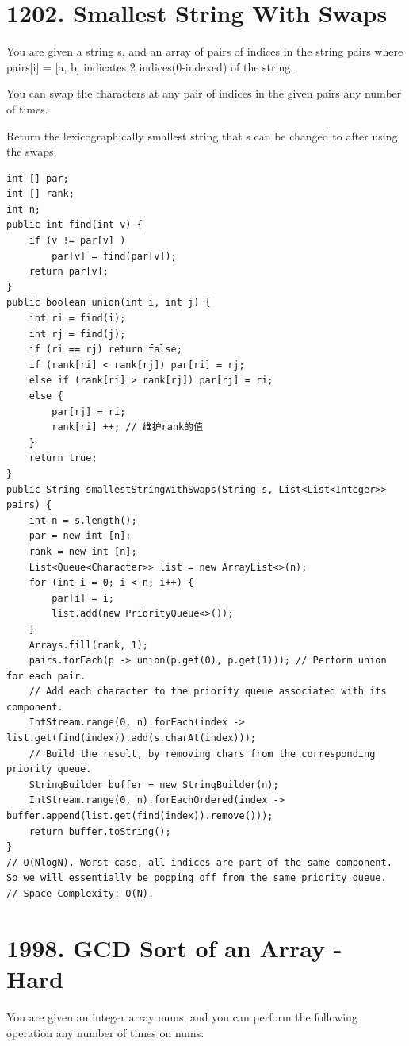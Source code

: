 \documentclass[9pt, b5paaper]{book}
\begin{document}
\section{1202. Smallest String With Swaps}
\label{sec-17-5}
You are given a string s, and an array of pairs of indices in the string pairs where pairs[i] = [a, b] indicates 2 indices(0-indexed) of the string.

You can swap the characters at any pair of indices in the given pairs any number of times.

Return the lexicographically smallest string that s can be changed to after using the swaps.
\begin{verbatim}
int [] par;
int [] rank;
int n;
public int find(int v) {
    if (v != par[v] ) 
        par[v] = find(par[v]);
    return par[v];
}
public boolean union(int i, int j) {
    int ri = find(i);
    int rj = find(j);
    if (ri == rj) return false;
    if (rank[ri] < rank[rj]) par[ri] = rj;
    else if (rank[ri] > rank[rj]) par[rj] = ri;
    else {
        par[rj] = ri;
        rank[ri] ++; // 维护rank的值
    }
    return true;
}
public String smallestStringWithSwaps(String s, List<List<Integer>> pairs) {
    int n = s.length();
    par = new int [n];
    rank = new int [n];
    List<Queue<Character>> list = new ArrayList<>(n);
    for (int i = 0; i < n; i++) {
        par[i] = i;
        list.add(new PriorityQueue<>());
    }
    Arrays.fill(rank, 1);
    pairs.forEach(p -> union(p.get(0), p.get(1))); // Perform union for each pair.
    // Add each character to the priority queue associated with its component.
    IntStream.range(0, n).forEach(index -> list.get(find(index)).add(s.charAt(index)));
    // Build the result, by removing chars from the corresponding priority queue.
    StringBuilder buffer = new StringBuilder(n);
    IntStream.range(0, n).forEachOrdered(index -> buffer.append(list.get(find(index)).remove()));
    return buffer.toString();
}
// O(NlogN). Worst-case, all indices are part of the same component. So we will essentially be popping off from the same priority queue.
// Space Complexity: O(N).
\end{verbatim}

\section{1998. GCD Sort of an Array - Hard}
\label{sec-17-6}
You are given an integer array nums, and you can perform the following operation any number of times on nums:
\end{document}
